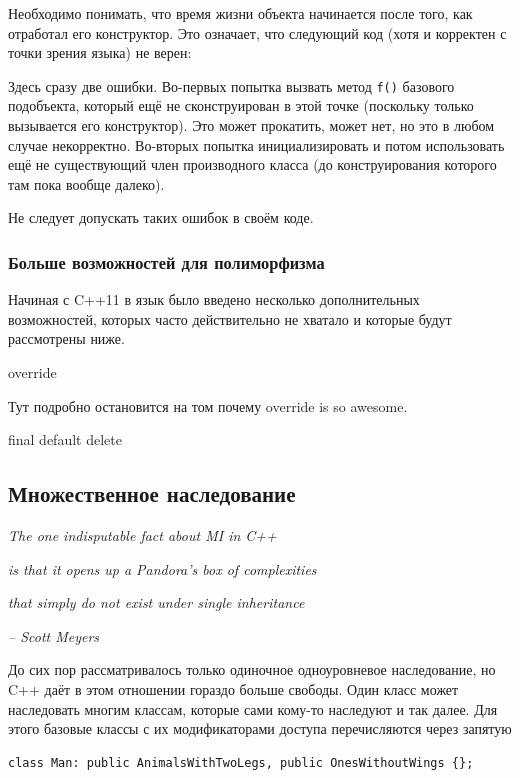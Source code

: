 \documentclass[a4paper,12pt,oneside]{article}
\begin{document}
Необходимо понимать, что время жизни объекта начинается после того, как отработал его конструктор. Это означает, что следующий код (хотя и корректен с точки зрения языка) не верен:



Здесь сразу две ошибки. Во-первых попытка вызвать метод \lstinline!f()! базового подобъекта, который ещё не сконструирован в этой точке (поскольку только вызывается его конструктор). Это может прокатить, может нет, но это в любом случае некорректно. Во-вторых попытка инициализировать и потом использовать ещё не существующий член производного класса (до конструирования которого там пока вообще далеко).

Не следует допускать таких ошибок в своём коде.

\subsubsection{Больше возможностей для полиморфизма}\label{NewVirtual}

Начиная с C++11 в язык было введено несколько дополнительных возможностей, которых часто действительно не хватало и которые будут рассмотрены ниже.

override

Тут подробно остановится на том почему override is so awesome.

final
default
delete

\pagebreak
\subsection{Множественное наследование}\label{MultipleInheritance}

\hfill\textit{The one indisputable fact about MI in C++}

\hfill\textit{is that it opens up a Pandora's box of complexities}

\hfill\textit{that simply do not exist under single inheritance}{\vspace{0.5em}}

\hfill\textit{-- Scott Meyers}

До сих пор рассматривалось только одиночное одноуровневое наследование, но C++ даёт в этом отношении гораздо больше свободы. Один класс может наследовать многим классам, которые сами кому-то наследуют и так далее. Для этого базовые классы с их модификаторами доступа перечисляются через запятую

\begin{lstlisting}
class Man: public AnimalsWithTwoLegs, public OnesWithoutWings {};
\end{lstlisting}
\end{document}
